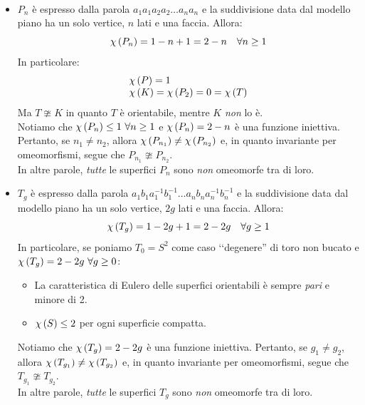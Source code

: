\begin{demonstration}~{}
	\begin{itemize}
		\item $P_n$ è espresso dalla parola $a_1a_1a_2a_2\ldots a_na_n$ e la suddivisione data dal modello piano ha un solo vertice, $n$ lati e una faccia. Allora:
		\begin{equation}
			\euler{P_n}{\ }=1-n+1=2-n\quad \forall n\geq 1
		\end{equation}
	In particolare:
	\begin{equation*}
		\begin{array}{l}
			\euler{P}{\ }=1\\
			\euler{K}{\ }=\euler{P_2}{\ }=0=\euler{T}{\ }
		\end{array}
	\end{equation*}
Ma $T\ncong K$ in quanto $T$ è orientabile, mentre $K$ \textit{non} lo è.\\
Notiamo che $\euler{P_n}{\ }\leq 1\ \forall n\geq 1$ e $\euler{P_n}{\ }= 2-n$ è una funzione iniettiva. Pertanto, se $n_1\neq n_2$, allora $\euler{P_{n_1}}{\ }\neq\euler{P_{n_2}}{\ }$ e, in quanto invariante per omeomorfismi, segue che $P_{n_1}\ncong P_{n_2}$.\\
In altre parole, \textit{tutte} le superfici $P_n$ sono \textit{non} omeomorfe tra di loro.
\item $T_g$ è espresso dalla parola $a_1b_1a_1^{-1}b_1^{-1}\ldots a_nb_na_n^{-1}b_n^{-1}$ e la suddivisione data dal modello piano ha un solo vertice, $2g$ lati e una faccia. Allora:
\begin{equation}
	\euler{T_g}{\ }=1-2g+1=2-2g\quad \forall g\geq 1
\end{equation}
In particolare, se poniamo $T_0=S^2$ come caso ‘‘degenere'' di toro non bucato e $\euler{T_g}{\ }=2-2g\ \forall g\geq 0$:
\begin{itemize}
	\item La caratteristica di Eulero delle superfici orientabili è sempre \textit{pari} e minore di 2.
	\item $\euler{S}{\ }\leq 2$ per ogni superficie compatta.
\end{itemize}
Notiamo che $\euler{T_g}{\ }= 2-2g$ è una funzione iniettiva. Pertanto, se $g_1\neq g_2$, allora $\euler{T_{g_1}}{\ }\neq\euler{T_{g_2}}{\ }$ e, in quanto invariante per omeomorfismi, segue che $T_{g_1}\ncong T_{g_2}$.\\
In altre parole, \textit{tutte} le superfici $T_g$ sono \textit{non} omeomorfe tra di loro.
\end{itemize}
\vspace{-3mm}
\end{demonstration}

